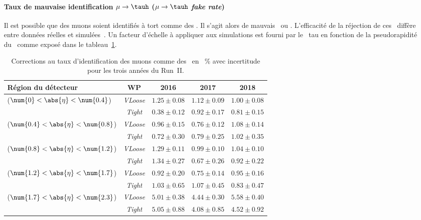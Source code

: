 \paragraph{Taux de mauvaise identification $\mu\to\tauh$ (\emph{$\mu\to\tauh$ fake rate})}
Il est possible que des muons soient identifiés à tort comme des \tauh.
Il s'agit alors de mauvais \tauh\ ou \og \ftauhs \fg{}.
L'efficacité de la réjection de ces \ftauhs\ diffère entre données réelles et simulées~\cite{TauPOG}.
Un facteur d'échelle à appliquer aux simulations est fourni par le \POG\ tau en fonction de la pseudorapidité du \ftauh\ comme exposé dans le tableau~\ref{tab-chapter-HTT_analysis-section-corrections-mu_to_tau_SF}.
\begin{table}[h]
\centering
\begin{tabular}{lcccc}
\toprule
Région du détecteur & WP & 2016 & 2017 & 2018 \\
\midrule
($\num{0}<\abs{\eta}<\num{0.4}$) & \emph{VLoose} & $\num{1.25}\pm\num{0.08}$ & $\num{1.12}\pm\num{0.09}$ & $\num{1.00}\pm\num{0.08}$ \\
 & \emph{Tight} & $\num{0.38}\pm\num{0.12}$ & $\num{0.92}\pm\num{0.17}$ & $\num{0.81}\pm\num{0.15}$ \\
($\num{0.4}<\abs{\eta}<\num{0.8}$) & \emph{VLoose} & $\num{0.96}\pm\num{0.15}$ & $\num{0.76}\pm\num{0.12}$ & $\num{1.08}\pm\num{0.14}$ \\
 & \emph{Tight} & $\num{0.72}\pm\num{0.30}$ & $\num{0.79}\pm\num{0.25}$ & $\num{1.02}\pm\num{0.35}$ \\
($\num{0.8}<\abs{\eta}<\num{1.2}$) & \emph{VLoose} & $\num{1.29}\pm\num{0.11}$ & $\num{0.99}\pm\num{0.10}$ & $\num{1.04}\pm\num{0.10}$ \\
 & \emph{Tight} & $\num{1.34}\pm\num{0.27}$ & $\num{0.67}\pm\num{0.26}$ & $\num{0.92}\pm\num{0.22}$ \\
($\num{1.2}<\abs{\eta}<\num{1.7}$) & \emph{VLoose} & $\num{0.92}\pm\num{0.20}$ & $\num{0.75}\pm\num{0.14}$ & $\num{0.95}\pm\num{0.16}$ \\
 & \emph{Tight} & $\num{1.03}\pm\num{0.65}$ & $\num{1.07}\pm\num{0.45}$ & $\num{0.83}\pm\num{0.47}$ \\
($\num{1.7}<\abs{\eta}<\num{2.3}$) & \emph{VLoose} & $\num{5.01}\pm\num{0.38}$ & $\num{4.44}\pm\num{0.30}$ & $\num{5.58}\pm\num{0.40}$ \\
 & \emph{Tight} & $\num{5.05}\pm\num{0.88}$ & $\num{4.08}\pm\num{0.85}$ & $\num{4.52}\pm\num{0.92}$ \\
\bottomrule
\end{tabular}
\caption[Corrections au taux d'identification des muons comme des \tauh.]{Corrections au taux d'identification des muons comme des \tauh\ en \SI{}{\%} avec incertitude pour les trois années du Run~II.}
\label{tab-chapter-HTT_analysis-section-corrections-mu_to_tau_SF}
\end{table}
